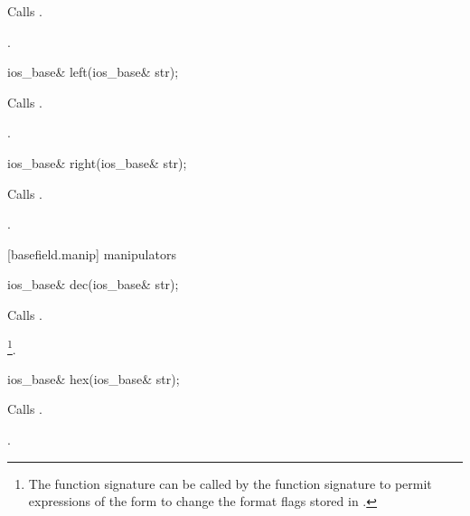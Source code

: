\begin{itemdescr}
\pnum
\effects
Calls
.

\pnum
\returns
{}.
\end{itemdescr}

%
\begin{itemdecl}
ios_base& left(ios_base& str);
\end{itemdecl}

\begin{itemdescr}
\pnum
\effects
Calls
.

\pnum
\returns
{}.
\end{itemdescr}

%
\begin{itemdecl}
ios_base& right(ios_base& str);
\end{itemdecl}

\begin{itemdescr}
\pnum
\effects
Calls
.

\pnum
\returns
{}.
\end{itemdescr}

[basefield.manip]{ manipulators}

%
\begin{itemdecl}
ios_base& dec(ios_base& str);
\end{itemdecl}

\begin{itemdescr}
\pnum
\effects
Calls
.

\pnum
\returns
{}\footnote{The function signature
can be called by
the function signature
to permit expressions of the form
to change the format flags stored in
.}.
\end{itemdescr}

%
\begin{itemdecl}
ios_base& hex(ios_base& str);
\end{itemdecl}

\begin{itemdescr}
\pnum
\effects
Calls
.

\pnum
\returns
{}.
\end{itemdescr}

